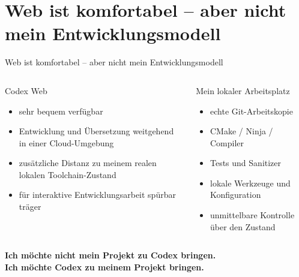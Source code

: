 \documentclass[\fhformat,10pt]{fh-ooe}
\begin{document}
\section{Web ist komfortabel -- aber nicht mein Entwicklungsmodell}
\begin{frame}{Web ist komfortabel -- aber nicht mein Entwicklungsmodell}
\begin{columns}[T]
\begin{block}{Codex Web}
\begin{itemize}
  \item sehr bequem verfügbar
  \item Entwicklung und Übersetzung weitgehend in einer Cloud-Umgebung
  \item zusätzliche Distanz zu meinem realen lokalen Toolchain-Zustand
  \item für interaktive Entwicklungsarbeit spürbar träger
\end{itemize}
\end{block}
\begin{block}{Mein lokaler Arbeitsplatz}
\begin{itemize}
  \item echte Git-Arbeitskopie
  \item CMake / Ninja / Compiler
  \item Tests und Sanitizer
  \item lokale Werkzeuge und Konfiguration
  \item unmittelbare Kontrolle über den Zustand
\end{itemize}
\end{block}
\end{columns}
\vspace{0.55em}
\begin{center}
\Large
\textbf{Ich möchte nicht mein Projekt zu Codex bringen.}\\[0.25em]
\color{fh-ooe-red}\textbf{Ich möchte Codex zu meinem Projekt bringen.}
\end{center}
\end{frame}

\end{document}
